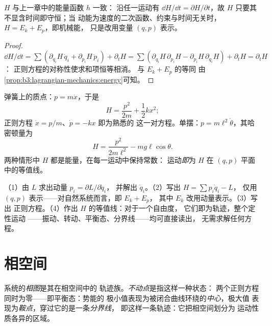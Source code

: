 \begin{proposition}[$H$ 的意义]\label{prop:b3:hamiltonian-mechanics:energy}
$H$ 与上一章中的能量函数 $h$ 一致：
沿任一运动有 $\dd H/\dd t = \partial H/\partial t$，故 $H$
只要其不显含时间即守恒；当
动能为速度的二次函数、约束与时间无关时，
$H = E_k + E_p$，即机械能，
只是改用变量 $(q, p)$ 表示。
\end{proposition}

\begin{proof}
$\dd H/\dd t = \sum(\partial_{q_i}H\,\dot q_i + \partial_{p_i}H\,\dot
p_i) + \partial_tH = \sum(\partial_{q_i}H\,\partial_{p_i}H -
\partial_{p_i}H\,\partial_{q_i}H) + \partial_tH = \partial_tH$：
正则方程的对称性使求和项恒等相消。
与 $E_k + E_p$ 的等同
由\cref{prop:b3:lagrangian-mechanics:energy}可知。
\end{proof}

\begin{example}[两个哈密顿量]\label{ex:b3:hamiltonian-mechanics:examples}
弹簧上的质点：$p = m\dot x$，于是
\[
H = \frac{p^2}{2m} + \frac12 kx^2 ;
\]
正则方程 $\dot x = p/m$、$\dot p = -kx$ 即为熟悉的
这一对方程。单摆：$p = m\ell^2\dot\theta$，其哈密顿量为
\[
H = \frac{p^2}{2m\ell^2} - mg\ell\cos\theta .
\]
两种情形中 $H$ 都是能量，在每一运动中保持常数：
运动\emph{即}为 $H$ 在 $(q,p)$ 平面中的等值线。
\end{example}

\begin{method}[哈密顿方法]\label{met:b3:hamiltonian-mechanics:recipe}
（1）由 $L$ 求出动量 $p_i = \partial L/\partial\dot q_i$，
并解出 $\dot q_i$。（2）写出 $H = \sum p_i\dot q_i - L$，
仅用 $(q, p)$ 表示——对自然系统而言，即 $E_k + E_p$，
其中 $E_k$ 改用动量表示。（3）写出
正则方程。（4）作出 $H$ 的等值线：对于一个自由度，
它们即为轨迹，整个定性运动
——振动、转动、平衡态、分界线——均可直接读出，
无需求解任何方程。
\end{method}

\section{相空间}

\begin{definition}[相图、不动点与分界线]\label{def:b3:hamiltonian-mechanics:portrait}
系统的\emph{相图}是其在相空间中的
轨迹族。\emph{不动点}是指这样一种状态：
两个正则方程同时为零——即平衡态：势能的
极小值表现为被闭合曲线环绕的\emph{中心}，极大值
表现为\emph{鞍点}，穿过它的是一条\emph{分界线}，
即这样一条轨迹：它把相空间划分为
运动性质各异的区域。
\end{definition}

